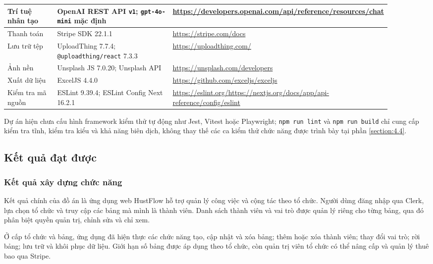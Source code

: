 \documentclass[../DoAn.tex]{subfiles}
\begin{document}
\begin{longtable}{|>{\raggedright\arraybackslash}p{0.19\linewidth}|>{\raggedright\arraybackslash}p{0.42\linewidth}|>{\raggedright\arraybackslash}p{0.29\linewidth}|}
    Trí tuệ nhân tạo & OpenAI REST API \texttt{v1}; \texttt{gpt-4o-mini} mặc định & \url{https://developers.openai.com/api/reference/resources/chat} \\ \hline
    Thanh toán & Stripe SDK 22.1.1 & \url{https://stripe.com/docs} \\ \hline
    Lưu trữ tệp & UploadThing 7.7.4; \texttt{@uploadthing/react} 7.3.3 & \url{https://uploadthing.com/} \\ \hline
    Ảnh nền & Unsplash JS 7.0.20; Unsplash API & \url{https://unsplash.com/developers} \\ \hline
    Xuất dữ liệu & ExcelJS 4.4.0 & \url{https://github.com/exceljs/exceljs} \\ \hline
    Kiểm tra mã nguồn & ESLint 9.39.4; ESLint Config Next 16.2.1 & \url{https://eslint.org/}\newline \url{https://nextjs.org/docs/app/api-reference/config/eslint} \\ \hline
\end{longtable}
\endgroup

Dự án hiện chưa cấu hình framework kiểm thử tự động như Jest, Vitest hoặc Playwright; \texttt{npm run lint} và \texttt{npm run build} chỉ cung cấp kiểm tra tĩnh, kiểm tra kiểu và khả năng biên dịch, không thay thế các ca kiểm thử chức năng được trình bày tại phần \ref{section:4.4}.

\subsection{Kết quả đạt được}
\label{subsection:4.3.2}

\subsubsection{Kết quả xây dựng chức năng}

Kết quả chính của đồ án là ứng dụng web HustFlow hỗ trợ quản lý công việc và cộng tác theo tổ chức. Người dùng đăng nhập qua Clerk, lựa chọn tổ chức và truy cập các bảng mà mình là thành viên. Danh sách thành viên và vai trò được quản lý riêng cho từng bảng, qua đó phân biệt quyền quản trị, chỉnh sửa và chỉ xem.

Ở cấp tổ chức và bảng, ứng dụng đã hiện thực các chức năng tạo, cập nhật và xóa bảng; thêm hoặc xóa thành viên; thay đổi vai trò; rời bảng; lưu trữ và khôi phục dữ liệu. Giới hạn số bảng được áp dụng theo tổ chức, còn quản trị viên tổ chức có thể nâng cấp và quản lý thuê bao qua Stripe.
\end{document}
